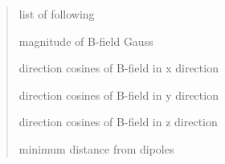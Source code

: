 \documentclass[letterpaper,10pt,english]{sphinxmanual}
\begin{document}
\begin{fulllineitems}
\begin{quote}
\begin{description}
\begin{DUlineblock}{0em}
\item[] list of following
\item[]
\begin{DUlineblock}{\DUlineblockindent}
\item[]      magnitude of B-field Gauss
\item[]      direction cosines of B-field in x direction
\item[]      direction cosines of B-field in y direction
\item[]      direction cosines of B-field in z direction
\item[]    minimum distance from dipoles
\end{DUlineblock}
\end{DUlineblock}


\end{description}\end{quote}

\end{fulllineitems}

\end{document}
